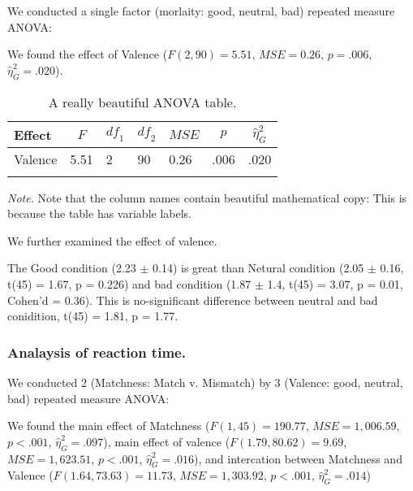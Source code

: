 \documentclass[man]{apa6}
\begin{document}
We conducted a single factor (morlaity: good, neutral, bad) repeated measure ANOVA:

We found the effect of Valence (\(F(2, 90) = 5.51\), \(\mathit{MSE} = 0.26\), \(p = .006\), \(\hat{\eta}^2_G = .020\)).

\begin{table}[tbp]
\begin{center}
\begin{threeparttable}
\caption{\label{tab:unnamed-chunk-1}A really beautiful ANOVA table.}
\begin{tabular}{lllllll}
\toprule
Effect & \multicolumn{1}{c}{$F$} & \multicolumn{1}{c}{$\mathit{df}_1$} & \multicolumn{1}{c}{$\mathit{df}_2$} & \multicolumn{1}{c}{$\mathit{MSE}$} & \multicolumn{1}{c}{$p$} & \multicolumn{1}{c}{$\hat{\eta}^2_G$}\\
\midrule
Valence & 5.51 & 2 & 90 & 0.26 & .006 & .020\\
\bottomrule
\addlinespace
\end{tabular}
\begin{tablenotes}[para]
\normalsize{\textit{Note.} Note that the column names contain beautiful mathematical copy: This is because the table has variable labels.}
\end{tablenotes}
\end{threeparttable}
\end{center}
\end{table}

We further examined the effect of valence.

The Good condition (2.23 \(\pm\) 0.14) is great than Netural condition (2.05 \(\pm\) 0.16, t(45) = 1.67, p = 0.226) and bad condition (1.87 \(\pm\) 1.4, t(45) = 3.07, p = 0.01, Cohen'd = 0.36). This is no-significant difference between neutral and bad conidition, t(45) = 1.81, p = 1.77.

\hypertarget{analaysis-of-reaction-time.}{%
\subsubsection{Analaysis of reaction time.}\label{analaysis-of-reaction-time.}}

We conducted 2 (Matchness: Match v. Mismatch) by 3 (Valence: good, neutral, bad) repeated measure ANOVA:

We found the main effect of Matchness (\(F(1, 45) = 190.77\), \(\mathit{MSE} = 1,006.59\), \(p < .001\), \(\hat{\eta}^2_G = .097\)), main effect of valence (\(F(1.79, 80.62) = 9.69\), \(\mathit{MSE} = 1,623.51\), \(p < .001\), \(\hat{\eta}^2_G = .016\)), and intercation between Matchness and Valence (\(F(1.64, 73.63) = 11.73\), \(\mathit{MSE} = 1,303.92\), \(p < .001\), \(\hat{\eta}^2_G = .014\))
\end{document}
